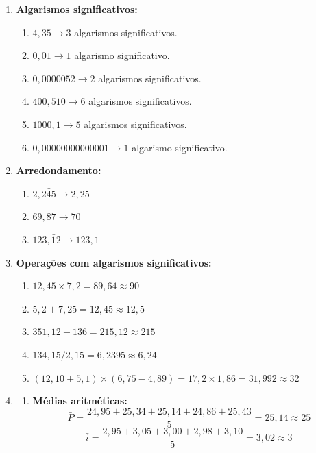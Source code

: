 \begin{enumerate}[label=\textbf{\arabic*)}, leftmargin=*]
    \item \textbf{Algarismos significativos:}
    \begin{enumerate}[label=\alph*)]
        \item $4{,}35 \rightarrow 3$ algarismos significativos.
        \item $0{,}01 \rightarrow 1$ algarismo significativo.
        \item $0{,}0000052 \rightarrow 2$ algarismos significativos.
        \item $400{,}510 \rightarrow 6$ algarismos significativos.
        \item $1000{,}1 \rightarrow 5$ algarismos significativos.
        \item $0{,}00000000000001 \rightarrow 1$ algarismo significativo.
    \end{enumerate}

    \item \textbf{Arredondamento:}
    \begin{enumerate}[label=\alph*)]
        \item $2{,}2\bar{4}5 \rightarrow 2{,}25$
        \item $6\bar{9},87 \rightarrow 70$
        \item $123,\bar{1}2 \rightarrow 123{,}1$
    \end{enumerate}

    \item \textbf{Operações com algarismos significativos:}
    \begin{enumerate}[label=\alph*)]
        \item $12{,}45 \times 7{,}2 = 89{,}64 \approx 90$
        \item $5{,}2 + 7{,}25 = 12{,}45 \approx 12{,}5$
        \item $351{,}12 - 136 = 215{,}12 \approx 215$
        \item $134{,}15 / 2{,}15 = 6{,}2395 \approx 6{,}24$
        \item $(12{,}10 + 5{,}1) \times (6{,}75 - 4{,}89) = 17{,}2 \times 1{,}86 = 31{,}992 \approx 32$
    \end{enumerate}

    \item
    \begin{enumerate}[label=\alph*)]
        \item \textbf{Médias aritméticas:}
        \[
        \bar{P} = \frac{24{,}95 + 25{,}34 + 25{,}14 + 24{,}86 + 25{,}43}{5} = 25{,}14 \approx 25
        \]
        \[
        \bar{i} = \frac{2{,}95 + 3{,}05 + 3{,}00 + 2{,}98 + 3{,}10}{5} = 3{,}02 \approx 3
        \]


\end{enumerate}
\end{enumerate}
